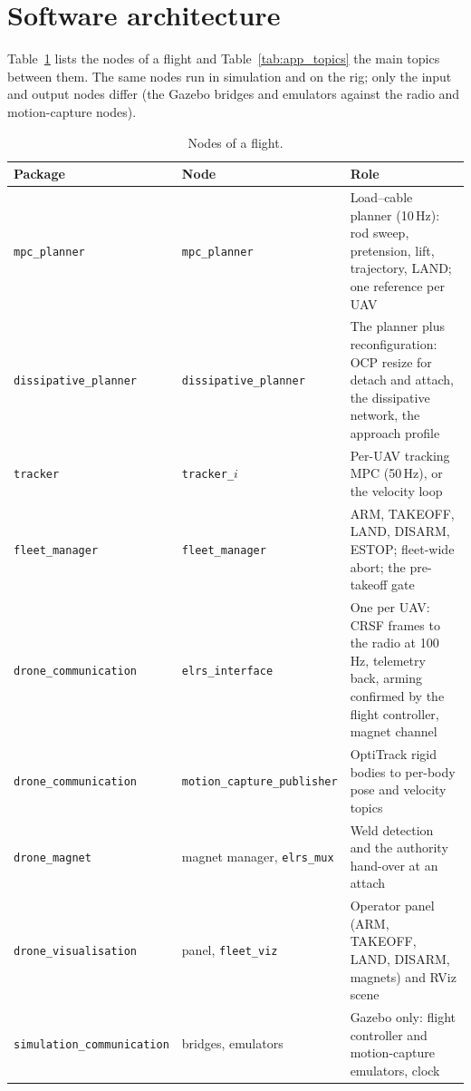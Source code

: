 \appendix

\section{Software architecture}
\label{sec:app_software}

Table~\ref{tab:app_nodes} lists the nodes of a flight and Table~\ref{tab:app_topics} the main
topics between them. The same nodes run in simulation and on the rig; only the input and output
nodes differ (the Gazebo bridges and emulators against the radio and motion-capture nodes).

\begin{table}[H]
\centering
\small
\caption{Nodes of a flight.}
\label{tab:app_nodes}
\begin{tabularx}{\textwidth}{llX}
\toprule
Package & Node & Role \\
\midrule
\texttt{mpc\_planner} & \texttt{mpc\_planner} & Load--cable planner (10\,Hz): rod sweep, pretension, lift, trajectory, LAND; one reference per UAV \\
\texttt{dissipative\_planner} & \texttt{dissipative\_planner} & The planner plus reconfiguration: OCP resize for detach and attach, the dissipative network, the approach profile \\
\texttt{tracker} & \texttt{tracker\_}$i$ & Per-UAV tracking MPC (50\,Hz), or the velocity loop \\
\texttt{fleet\_manager} & \texttt{fleet\_manager} & ARM, TAKEOFF, LAND, DISARM, ESTOP; fleet-wide abort; the pre-takeoff gate \\
\texttt{drone\_communication} & \texttt{elrs\_interface} & One per UAV: CRSF frames to the radio at 100\,Hz, telemetry back, arming confirmed by the flight controller, magnet channel \\
\texttt{drone\_communication} & \texttt{motion\_capture\_publisher} & OptiTrack rigid bodies to per-body pose and velocity topics \\
\texttt{drone\_magnet} & magnet manager, \texttt{elrs\_mux} & Weld detection and the authority hand-over at an attach \\
\texttt{drone\_visualisation} & panel, \texttt{fleet\_viz} & Operator panel (ARM, TAKEOFF, LAND, DISARM, magnets) and RViz scene \\
\texttt{simulation\_communication} & bridges, emulators & Gazebo only: flight controller and motion-capture emulators, clock \\
\bottomrule
\end{tabularx}
\end{table}

